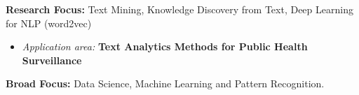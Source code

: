\par{\textbf{Research Focus: } Text Mining, Knowledge Discovery from Text, Deep Learning for NLP (word2vec)\vspace{0.5em}
\begin{itemize}
  \item \textit{Application area:} \textbf{Text Analytics Methods for Public Health Surveillance}\\
\end{itemize}
        \textbf{Broad Focus:} Data Science, Machine Learning and Pattern Recognition.\vspace{0.5em}
}
\vspace{1em}
